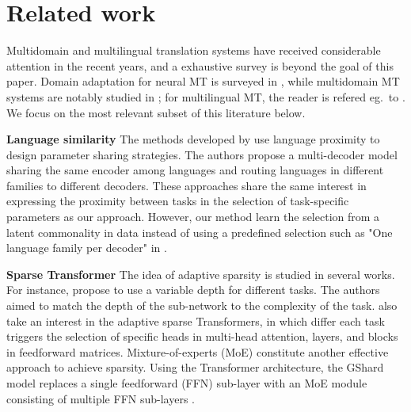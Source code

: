 \documentclass[11pt]{article}
\begin{document}

\section{Related work}\label{sec:related}
Multidomain and multilingual translation systems have received considerable attention in the recent years, and a exhaustive survey is beyond the goal of this paper. Domain adaptation for neural MT is surveyed in \citep{Chu17comparison}, while multidomain MT systems are notably studied in \cite{Saunders21Asurvey,Pham21revisiting}; for multilingual MT, the reader is refered eg.\ to \citep{Chu18multilingual,dabre20survey}. We focus on the most relevant subset of this literature below.

\textbf{Language similarity} The methods developed by \citep{sen19multilingual,kong21multilingual} use language proximity to design parameter sharing strategies. The authors propose a multi-decoder model sharing the same encoder among languages and routing languages in different families to different decoders. These approaches share the same interest in expressing the proximity between tasks in the selection of task-specific parameters as our approach. However, our method learn the selection from a latent commonality in data instead of using a predefined selection such as "One language family per decoder" in \cite{kong21multilingual}.

\textbf{Sparse Transformer} The idea of adaptive sparsity is studied in several works. For instance, \citet{xian20deep} propose to use a variable depth for different tasks. The authors aimed to match the depth of the sub-network to the complexity of the task. \citet{Gong21pay,Gong21adaptive} also take an interest in the adaptive sparse Transformers, in which differ each task triggers the selection of specific heads in multi-head attention, layers, and blocks in feedforward matrices. Mixture-of-experts (MoE) constitute another effective approach to achieve sparsity. Using the Transformer architecture, the GShard model replaces a single feedforward (FFN) sub-layer with an MoE module consisting of multiple FFN sub-layers \citep{lepikhin21gshard,william21switch}.
\end{document}
